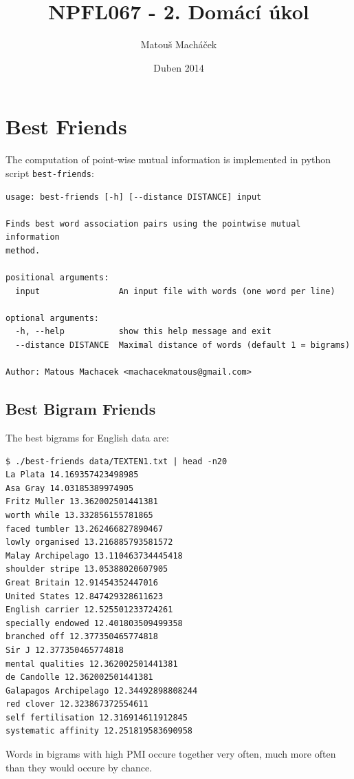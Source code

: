 \documentclass[12pt,a4paper]{article}
\title{NPFL067 - 2. Domácí úkol}
\author{Matouš Macháček}
\date{Duben 2014}
\begin{document}
\maketitle

\section{Best Friends}

The computation of point-wise mutual information is implemented in python
script \texttt{best-friends}:

\begin{verbatim}
usage: best-friends [-h] [--distance DISTANCE] input

Finds best word association pairs using the pointwise mutual information
method.

positional arguments:
  input                An input file with words (one word per line)

optional arguments:
  -h, --help           show this help message and exit
  --distance DISTANCE  Maximal distance of words (default 1 = bigrams)

Author: Matous Machacek <machacekmatous@gmail.com>
\end{verbatim}



\subsection{Best Bigram Friends}

The best bigrams for English data are:

\begin{verbatim}
$ ./best-friends data/TEXTEN1.txt | head -n20
La Plata 14.169357423498985
Asa Gray 14.03185389974905
Fritz Muller 13.362002501441381
worth while 13.332856155781865
faced tumbler 13.262466827890467
lowly organised 13.216885793581572
Malay Archipelago 13.110463734445418
shoulder stripe 13.05388020607905
Great Britain 12.91454352447016
United States 12.847429328611623
English carrier 12.525501233724261
specially endowed 12.401803509499358
branched off 12.377350465774818
Sir J 12.377350465774818
mental qualities 12.362002501441381
de Candolle 12.362002501441381
Galapagos Archipelago 12.34492898808244
red clover 12.323867372554611
self fertilisation 12.316914611912845
systematic affinity 12.251819583690958
\end{verbatim}

Words in bigrams with high PMI occure together very often, much more often than they would occure by chance. 
\end{document}
